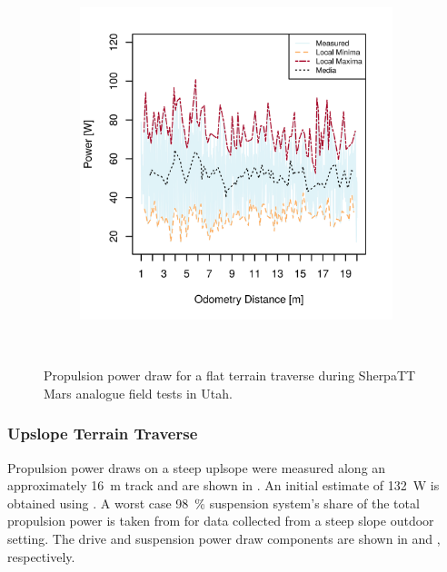 \begin{figure}[h]
\begin{subfigure}[t]{\subfigureWidth}
        \includegraphics[height=\graphicsHeight]{sections/design/power-budget/plots/locomotion-power-draw-on-flat-terrain-2.png}
		\label{fig:plot:sub:sherpatt-flat-terrain-power-draw-2}
	\end{subfigure}\\[0.8ex]
    \caption[Propulsion power draw for a flat terrain traverse]
            {Propulsion power draw for a flat terrain traverse during SherpaTT Mars analogue field tests in Utah.}
    \label{fig:plot:sherpatt-flat-terrain-power-draw}
\vspace{-2ex}
\end{figure}


\subsubsection{Upslope Terrain Traverse}
\label{sec:PowerBudget:PropulsionPowerBudget:UpslopeTerrainTraverse}
Propulsion power draws on a steep uplsope were measured along an approximately \SI{16}{\meter} track and are shown in . An initial estimate of \SI{132}{\watt} is obtained using . A worst case \SI{98}{\percent} suspension system's share of the total propulsion power is taken from  for data collected from a steep slope outdoor setting. The drive and suspension power draw components are shown in  and , respectively.

